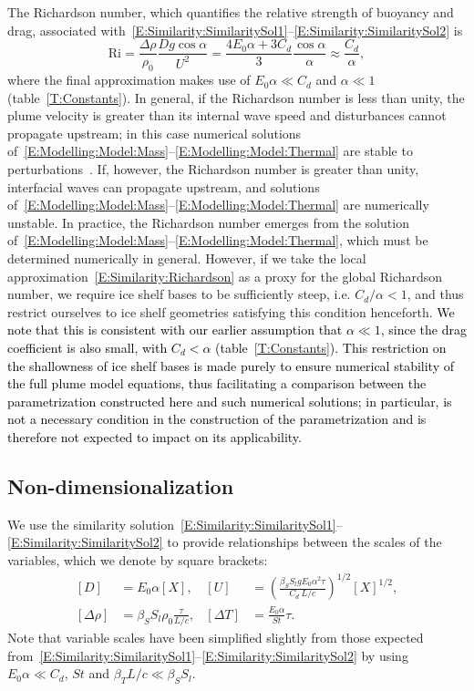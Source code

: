 \documentclass[openacc]{rsproca_new}%
\newcommand{\blue}[1]{{\color{blue} #1}}
\renewcommand{\blue}[1]{{\textcolor{black}{#1}}} %
\begin{document}
The Richardson number, which quantifies the relative strength of buoyancy and drag, associated with~\eqref{E:Similarity:SimilaritySol1}--\eqref{E:Similarity:SimilaritySol2} is
\begin{equation}\label{E:Similarity:Richardson}
\mathrm{Ri} = \frac{\Delta \rho}{\rho_0}\frac{D g \cos \alpha}{U^2} = \frac{4E_0 \alpha + 3C_d}{3} \frac{\cos \alpha}{\alpha} \approx \frac{C_d}{\alpha},
\end{equation}
where the final approximation makes use of $E_0 \alpha \ll C_d$ and $\alpha \ll 1$ (table~\ref{T:Constants}). In general, if the Richardson number is less than unity, the plume velocity is greater than its internal wave speed and disturbances cannot propagate upstream; in this case numerical solutions of~\eqref{E:Modelling:Model:Mass}--\eqref{E:Modelling:Model:Thermal} are stable to perturbations~\cite{Jenkinsphdthesis}. If, however, the Richardson number is greater than unity, interfacial waves can propagate upstream, and solutions of~\eqref{E:Modelling:Model:Mass}--\eqref{E:Modelling:Model:Thermal} are numerically unstable. In practice, the Richardson number emerges from the solution of~\eqref{E:Modelling:Model:Mass}--\eqref{E:Modelling:Model:Thermal}, which must be determined numerically in general. However, if we take the local approximation~\eqref{E:Similarity:Richardson} as a proxy for the global Richardson number, we require ice shelf bases to be sufficiently steep, i.e. $C_d/\alpha < 1$, and thus restrict ourselves to ice shelf geometries satisfying this condition henceforth. \blue{We note that this is consistent with our earlier assumption that $\alpha \ll 1$, since the drag coefficient is also small, with $C_d < \alpha$ (table~\ref{T:Constants}). This restriction on the shallowness of ice shelf bases is made purely to ensure numerical stability of the full plume model equations, thus facilitating a comparison between the parametrization constructed here and such numerical solutions; in particular, is not a necessary condition in the construction of the parametrization and is therefore not expected to impact on its applicability.}

\subsection{Non-dimensionalization}\label{S:Model:NonDim}
We use the similarity solution~\eqref{E:Similarity:SimilaritySol1}--\eqref{E:Similarity:SimilaritySol2} to provide relationships between the scales of the variables, which we denote by square brackets:
\begin{align}
\left[D\right] &= E_0 \alpha \left[X\right], & \left[U\right] &= \left(\frac{\beta_S S_l g E_0 \alpha^2 \tau}{C_d ~L/c}\right)^{1/2}[X]^{1/2},\label{E:Similarity:Scales1}\\
\left[\Delta \rho\right] &= \beta_S S_l \rho_0 \frac{\tau}{L/c}, & \left[\Delta T\right] &= \frac{E_0 \alpha}{St}\tau.\label{E:Similarity:Scales2}
\end{align}
Note that variable scales have been simplified slightly from those expected from~\eqref{E:Similarity:SimilaritySol1}--\eqref{E:Similarity:SimilaritySol2} by using $E_0 \alpha \ll C_d$, $St$ and $\beta_T L /c \ll \beta_S S_l$.
\end{document}
